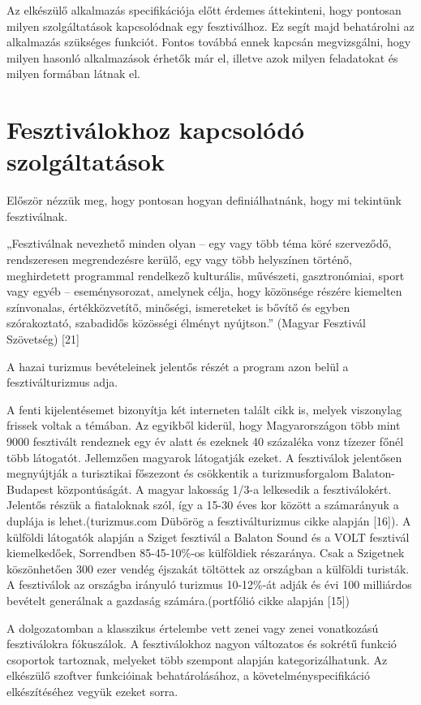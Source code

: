 
Az elkészülő alkalmazás specifikációja előtt érdemes áttekinteni, hogy pontosan milyen szolgáltatások kapcsolódnak egy fesztiválhoz. Ez segít majd behatárolni az alkalmazás szükséges funkciót. Fontos továbbá ennek kapcsán megvizsgálni, hogy milyen hasonló alkalmazások érhetők már el, illetve azok milyen feladatokat és milyen formában látnak el.

\section{Fesztiválokhoz kapcsolódó szolgáltatások}

Először nézzük meg, hogy pontosan hogyan definiálhatnánk, hogy mi tekintünk fesztiválnak.

„Fesztiválnak nevezhető minden olyan – egy vagy több
téma köré szerveződő, rendszeresen megrendezésre
kerülő, egy vagy több helyszínen történő, meghirdetett
programmal rendelkező kulturális, művészeti, gasztronómiai,
sport vagy egyéb – eseménysorozat, amelynek
célja, hogy közönsége részére kiemelten színvonalas,
értékközvetítő, minőségi, ismereteket is bővítő és egyben
szórakoztató, szabadidős közösségi élményt nyújtson.”
(Magyar Fesztivál Szövetség)  [21]

A hazai turizmus bevételeinek jelentős részét a program azon belül a fesztiválturizmus adja.

A fenti kijelentésemet bizonyítja két interneten talált cikk is, melyek viszonylag frissek voltak a témában. Az egyikből kiderül, hogy Magyarországon több mint 9000 fesztivált rendeznek egy év alatt és ezeknek 40 százaléka vonz tízezer főnél több látogatót. Jellemzően magyarok látogatják ezeket. A fesztiválok jelentősen megnyújtják a turisztikai főszezont és csökkentik a turizmusforgalom Balaton-Budapest központúságát. A magyar lakosság 1/3-a lelkesedik a fesztiválokért. Jelentős részük a fiataloknak szól, így a 15-30 éves kor között a számarányuk a duplája is lehet.(turizmus.com Dübörög a fesztiválturizmus cikke alapján [16]). 
A külföldi látogatók alapján a Sziget fesztivál a Balaton Sound és a VOLT fesztivál kiemelkedőek, Sorrendben 85-45-10\%-os külföldiek részaránya. Csak a Szigetnek köszönhetően 300 ezer vendég éjszakát töltöttek az országban a külföldi turisták. A fesztiválok az országba irányuló turizmus 10-12\%-át adják és évi 100 milliárdos bevételt generálnak a gazdaság számára.(portfólió cikke alapján [15])

A dolgozatomban a klasszikus értelembe vett zenei vagy zenei vonatkozású fesztiválokra fókuszálok.
A fesztiválokhoz nagyon változatos és sokrétű funkció csoportok tartoznak, melyeket több szempont alapján kategorizálhatunk. Az elkészülő szoftver funkcióinak behatárolásához, a követelményspecifikáció elkészítéséhez vegyük ezeket sorra.

